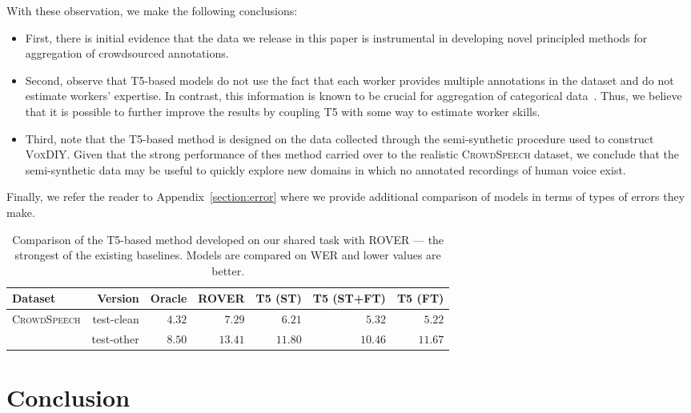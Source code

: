 \documentclass{article}
\newcommand{\speech}{\textsc{CrowdSpeech}}
\newcommand{\vox}{\textsc{VoxDIY}}
\begin{document}
With these observation, we make the following conclusions:
\begin{itemize}[itemsep=0pt, leftmargin=15pt, topsep=0pt]
    \item First, there is initial evidence that the data we release in this paper is instrumental in developing novel principled methods for aggregation of crowdsourced annotations. 
    
    \item Second, observe that T5-based models do not use the fact that each worker provides multiple annotations in the dataset and do not estimate workers' expertise. In contrast, this information is known to be crucial for aggregation of categorical data~\citep{Dawid1979MaximumLE,whitehill09count}. Thus, we believe that it is possible to further improve the results by coupling T5 with some way to estimate worker skills.
    
    \item Third, note that the T5-based method is designed on the data collected through the semi-synthetic procedure used to construct \vox{}. Given that the strong performance of thes method carried over to the realistic \speech{} dataset, we conclude that the semi-synthetic data may be useful to quickly explore new domains in which no annotated recordings of human voice exist.
\end{itemize}

Finally, we refer the reader to Appendix~\ref{section:error} where we provide additional comparison of models in terms of types of errors they make.

\begin{table}[t]
\centering
\caption{\label{table:new_results}Comparison of the T5-based method developed on our shared task with ROVER --- the strongest of the existing baselines. Models are compared on WER and lower values are better.}
\begin{tabular}{lrrrrrr}\toprule
\textbf{Dataset} & \textbf{Version}  & \textbf{Oracle} & \textbf{ROVER} & \textbf{T5 (ST)} & \textbf{T5 (ST+FT)} & \textbf{T5 (FT)} \\\midrule
\multirow{2}{*}{\speech} & test-clean &  $4.32$ & $7.29$ & $6.21$ & $5.32$ & $5.22$ \\
& test-other & $8.50$ & $13.41$ & $11.80$ & $10.46$ & $11.67$ \\
\midrule
\end{tabular}
\end{table}


\section{Conclusion}
\label{section:conclusion}
\end{document}
